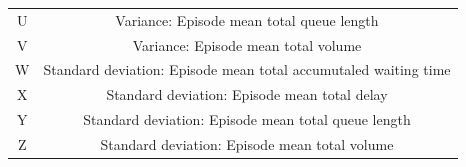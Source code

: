 \begin{table}[htbp]
\begin{tabular}{|c|c|}
     U &                       Variance: Episode mean total queue length \\
     V &                             Variance: Episode mean total volume \\
     W & Standard deviation: Episode mean total accumutaled waiting time \\
     X &                    Standard deviation: Episode mean total delay \\
     Y &             Standard deviation: Episode mean total queue length \\
     Z &                   Standard deviation: Episode mean total volume \\
\hline
\end{tabular}
\end{table}

\pagebreak


